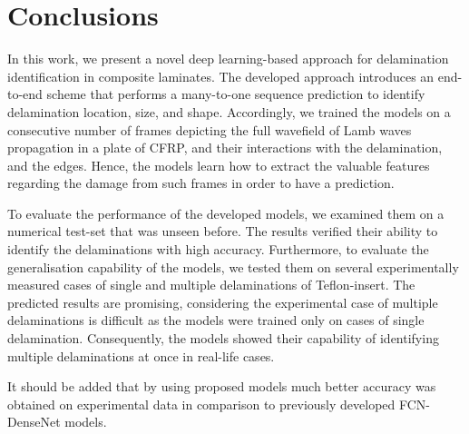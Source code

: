\section{Conclusions}
\label{conclusion}
In this work, we present a novel deep learning-based approach for delamination identification in composite laminates.
The developed approach introduces an end-to-end scheme that performs a many-to-one sequence prediction to identify delamination location, size, and shape.
Accordingly, we trained the models on a consecutive number of frames depicting the full wavefield of Lamb waves propagation in a plate of CFRP, and their interactions with the delamination, and the edges.
Hence, the models learn how to extract the valuable features regarding the damage from such frames in order to have a prediction.

To evaluate the performance of the developed models, we examined them on a numerical test-set that was unseen before.
The results verified their ability to identify the delaminations with high accuracy. 
Furthermore, to evaluate the generalisation capability of the models, we tested them on several experimentally measured cases of single and multiple delaminations of Teflon-insert.
The predicted results are promising, considering the experimental case of multiple delaminations is difficult as the models were trained only on cases of single delamination.
Consequently, the models showed their capability of identifying multiple delaminations at once in real-life cases.
 
It should be added that by using proposed models much better accuracy was obtained on experimental data in comparison to previously developed FCN-DenseNet models.
   


